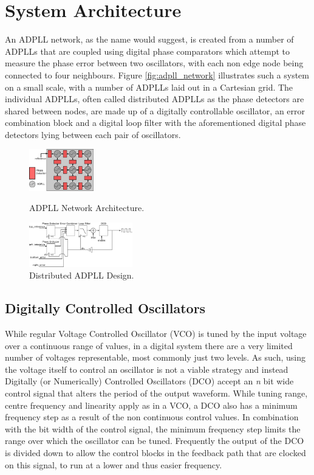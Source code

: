 \documentclass[conference]{IEEEtran}
\begin{document}
\section{System Architecture}
An ADPLL network, as the name would suggest, is created from a number of ADPLLs that are coupled using digital phase comparators which attempt to measure the phase error between two oscillators, with each non edge node being connected to four neighbours. Figure \ref{fig:adpll_network} illustrates such a system on a small scale, with a number of ADPLLs laid out in a Cartesian grid. The individual ADPLLs, often called distributed ADPLLs as the phase detectors are shared between nodes, are made up of a digitally controllable oscillator, an error combination block and a digital loop filter with the aforementioned digital phase detectors lying between each pair of oscillators.
\begin{figure}[h]
    \centering
    \includegraphics[width=0.25\textwidth]{adpll_network}
    \caption{ADPLL Network Architecture.}
    \label{fig:adpll_network}
    \vspace{0.5cm}
    \includegraphics[width=0.4\textwidth]{dist_adpll}
    \caption{Distributed ADPLL Design.}
    \label{fig:adpll_base}
    \vspace{-0.5cm}
\end{figure}
\subsection{Digitally Controlled Oscillators}
While regular Voltage Controlled Oscillator (VCO) is tuned by the input voltage over a continuous range of values, in a digital system there are a very limited number of voltages representable, most commonly just two levels. As such, using the voltage itself to control an oscillator is not a viable strategy and instead Digitally (or Numerically) Controlled Oscillators (DCO) accept an \textit{n} bit wide control signal that alters the period of the output waveform. While tuning range, centre frequency and linearity apply as in a VCO, a DCO also has a minimum frequency step as a result of the non continuous control values. %
In combination with the bit width of the control signal, the minimum frequency step limits the range over which the oscillator can be tuned. Frequently the output of the DCO is divided down to allow the control blocks in the feedback path that are clocked on this signal, to run at a lower and thus easier frequency.
\end{document}
